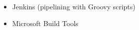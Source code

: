 \begin{multicols}{2}
	\begin{itemize}
		\item Jenkins (pipelining with Groovy scripts)
		\item Microsoft Build Tools
	\end{itemize}
	\vspace*{\fill}
\end{multicols}